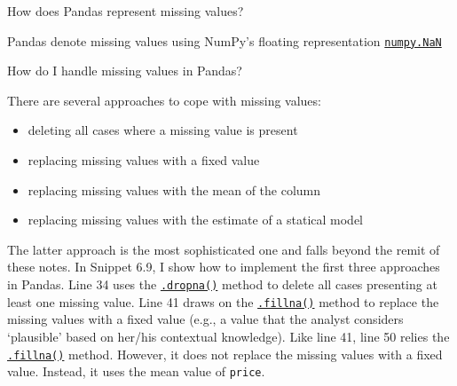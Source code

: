 \documentclass[a4paper,11pt]{book}
\newcommand{\question}[1]{%
    \begin{tcolorbox}[colback=comp_c!10,colframe=comp_c,sidebyside align=top,width=\linewidth,before skip=1ex]
        #1
    \end{tcolorbox}
    \switchcolumn%
}
\newcommand{\note}[1]{%
    \begin{tcolorbox}[colback=white!0,colframe=white!10,width=\linewidth,before skip=1ex]
        #1
    \end{tcolorbox}
}
\begin{document}
\begin{paracol}{2}
	\question{\raggedright How does Pandas represent missing values?}
	\note{Pandas denote missing values using NumPy's floating representation \href{https://numpy.org/doc/stable/reference/constants.html?highlight=nan#numpy.NaN}{\texttt{numpy.NaN}}
	}
\end{paracol}
\clearpage

\begin{paracol}{2}
	\question{\raggedright How do I handle missing values in Pandas?}
	\note{There are several approaches to cope with missing values:
	\begin{itemize}
		\item deleting all cases where a missing value is present
		\item replacing missing values with a fixed value
		\item replacing missing values with the mean of the column
		\item replacing missing values with the estimate of a statical model
	\end{itemize}
	
	\quad The latter approach is the most sophisticated one and falls beyond the remit of these notes. In Snippet 6.9, I show how to implement the first three approaches in Pandas. Line 34 uses the \href{https://pandas.pydata.org/docs/reference/api/pandas.DataFrame.dropna.html?highlight=dropna}{\texttt{.dropna()}} method to delete all cases presenting at least one missing value. Line 41 draws on the \href{https://pandas.pydata.org/docs/reference/api/pandas.DataFrame.fillna.html?highlight=fillna#pandas.DataFrame.fillna}{\texttt{.fillna()}} method to replace the missing values with a fixed value (e.g., a value that the analyst considers `plausible' based on her/his contextual knowledge). Like line 41, line 50 relies the \href{https://pandas.pydata.org/docs/reference/api/pandas.DataFrame.fillna.html?highlight=fillna#pandas.DataFrame.fillna}{\texttt{.fillna()}} method. However, it does not replace the missing values with a fixed value. Instead, it uses the mean value of \texttt{price}.
	} 
\end{paracol}
\end{document}
